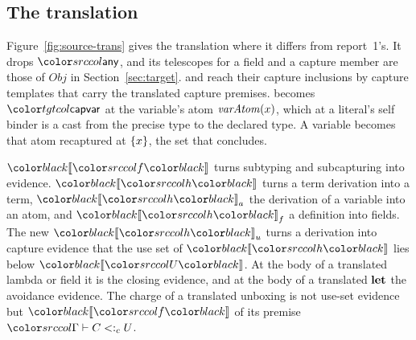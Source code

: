 \subsection{The translation}\label{sec:source-trans}
\mathtgt

Figure~\ref{fig:source-trans} gives the translation where it differs from report~1's. It drops $\cany$, and its telescopes for a field and a capture member are those of $\mathit{Obj}$ in Section~\ref{sec:target}.  and  reach their capture inclusions by capture templates that carry the translated capture premises.  becomes $\ev{capvar}$ at the variable's atom $\mathit{varAtom}(x)$, which at a literal's self binder is a cast from the precise type to the declared type. A variable becomes that atom recaptured at $\{x\}$, the set that  concludes.

$\trans{f}$ turns subtyping and subcapturing into evidence. $\trans{h}$ turns a term derivation into a term, $\transa{h}$ the derivation of a variable into an atom, and $\trans{h}_f$ a definition into fields. The new $\transu{h}$ turns a derivation into capture evidence that the use set of $\trans{h}$ lies below $\trans{U}$. At the body of a translated lambda or field it is the closing evidence, and at the body of a translated $\mathbf{let}$ the avoidance evidence. The charge of a translated unboxing is not use-set evidence but $\trans{f}$ of its premise $\subcj{\Gamma}{C}{U}$.

